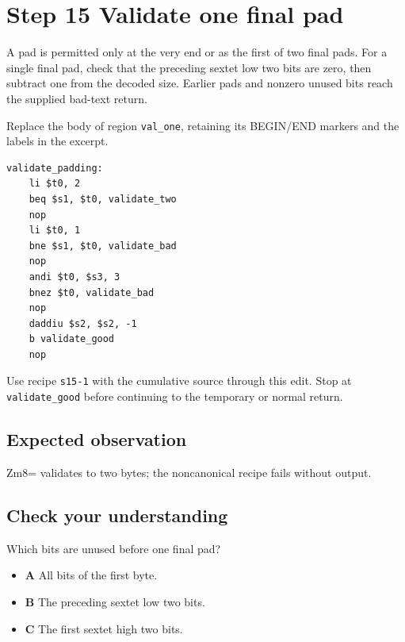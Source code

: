 \section{Step 15 Validate one final pad}\label{base64-s15}

A pad is permitted only at the very end or as the first of two final pads. For a single final pad, check that the preceding sextet low two bits are zero, then subtract one from the decoded size. Earlier pads and nonzero unused bits reach the supplied bad-text return.

Replace the body of region \texttt{val\_one}, retaining its BEGIN/END markers and the labels in the excerpt.

\begin{verbatim}
validate_padding:
    li $t0, 2
    beq $s1, $t0, validate_two
    nop
    li $t0, 1
    bne $s1, $t0, validate_bad
    nop
    andi $t0, $s3, 3
    bnez $t0, validate_bad
    nop
    daddiu $s2, $s2, -1
    b validate_good
    nop
\end{verbatim}

Use recipe \texttt{s15-1} with the cumulative source through this edit. Stop at \texttt{validate\_good} before continuing to the temporary or normal return.

\subsection{Expected observation}
Zm8= validates to two bytes; the noncanonical recipe fails without output.

\subsection{Check your understanding}
Which bits are unused before one final pad?

\begin{itemize}
  \item \textbf{A} All bits of the first byte.
  \item \textbf{B} The preceding sextet low two bits.
  \item \textbf{C} The first sextet high two bits.
\end{itemize}

